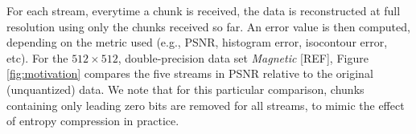 For each stream, everytime a chunk is received, the data is reconstructed at full resolution using
only the chunks received so far. An error value is then computed, depending on the metric used
(e.g., PSNR, histogram error, isocontour error, etc). For the $512 \times 512$, double-precision
data set \emph{Magnetic} [REF], Figure \ref{fig:motivation} compares the five streams in
PSNR relative to the original (unquantized) data. We note that for this particular comparison,
chunks containing only leading zero bits are removed for all streams, to mimic the effect of entropy
compression in practice.

